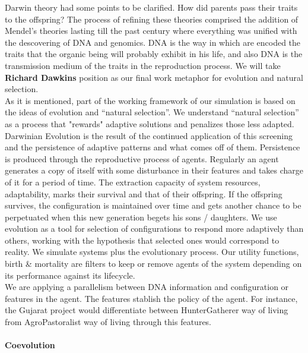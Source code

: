 \documentclass[11pt,oneside,a4paper,openright]{report}
\begin{document}
Darwin theory had some points to be clarified. How did parents pass their traits to the offspring?
The process of refining these theories comprised the addition of Mendel's theories lasting till 
the past century where everything was unified with the descovering of DNA and genomics. DNA is the 
way in which are encoded the traits that the organic being will probably exhibit in his life, and 
also DNA is the transmission medium of the traits in the reproduction process. We will take \textbf{Richard Dawkins} 
position as our final work metaphor for evolution and natural selection\cite{Dawkins1990}.\\ 
As it is mentioned, part of the working framework of our simulation is based on the ideas of evolution and ``natural selection''. We understand ``natural selection'' as a process that "rewards" adaptive solutions and penalizes those less adapted. Darwinian Evolution is the result of the continued application of this screening and the persistence of adaptive patterns and what comes off of them. Persistence is produced through the reproductive process of agents. Regularly an agent generates a copy of itself with some disturbance in their features and takes charge of it for a period of time. The extraction capacity of system resources, adaptability,  marks their survival and that of their offspring. If the offspring survives, the configuration is maintained over time and gets another chance to be perpetuated when this new generation begets his sons / daughters. We use evolution as a tool for selection of configurations to respond more adaptively than others, working with the hypothesis that selected ones would correspond to reality. We simulate systems plus the evolutionary process. Our utility functions, birth \& mortality are filters to keep or remove agents of the system depending on its performance against its lifecycle.\\ 
We are applying a parallelism between DNA information and configuration or features in the agent. The features stablish
the policy of the agent. For instance, the Gujarat project would differentiate between HunterGatherer way of living from AgroPastoralist way of living through this features.
\\ 
\paragraph{Coevolution}
\end{document}
